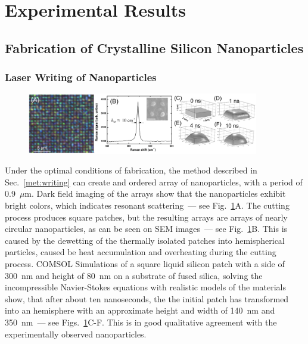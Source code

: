 \section{Experimental Results}
    \subsection{Fabrication of Crystalline Silicon Nanoparticles}
        \label{sec:Fabrication}

        \subsubsection{Laser Writing of Nanoparticles}

            \begin{figure}[!ht]
                    \begin{center}
                        \includegraphics[width=0.9\textwidth]{figs/results/fab/LaserWriting.eps}
                    \end{center}
                    \caption{}
                    \label{fig:LaserWriting}
            \end{figure}

                Under the optimal conditions of fabrication, the method described in Sec.~\ref{met:writing}
            can create and ordered array of nanoparticles, with a period of 0.9~$\mu$m. Dark field imaging of the arrays show that
            the nanoparticles exhibit bright colors, which indicates resonant scattering~--- see Fig.~\ref{fig:LaserWriting}A.
            The cutting process produces square patches, but the resulting arrays are arrays of nearly circular nanoparticles, as can be
            seen on SEM images~--- see Fig.~\ref{fig:LaserWriting}B. This is caused by the dewetting of the thermally isolated patches into
            hemispherical particles, caused be heat accumulation and overheating during the cutting process. COMSOL Simulations of a
            square liquid silicon patch with a side of 300~nm and height of 80~nm on a substrate of fused silica, solving the incompressible
            Navier-Stokes equations with realistic models of the materials show, that after about ten nanoseconds, the the initial patch has
            transformed into an hemisphere with an approximate height and width of 140~nm and 350~nm~--- see Figs.~\ref{fig:LaserWriting}C-F.
            This is in good qualitative agreement with the experimentally observed nanoparticles.

